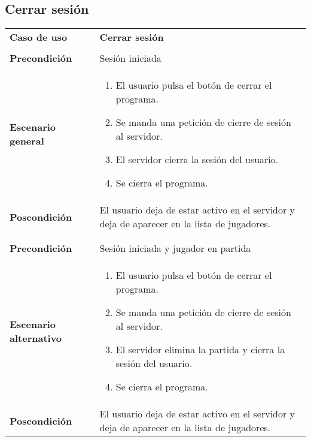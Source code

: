 \subsection{Cerrar sesión}

{\footnotesize
\begin{tabularx}{0.95\textwidth}{p{}|X}

\textbf{Caso de uso} & \textbf{Cerrar sesión} \\
& \\
\textbf{Precondición} & Sesión iniciada \\

\textbf{Escenario general} & \begin{enumerate}
\item El usuario pulsa el botón de cerrar el programa.
\item Se manda una petición de cierre de sesión al servidor.
\item El servidor cierra la sesión del usuario.
\item Se cierra el programa.
\end{enumerate} \\

\textbf{Poscondición} & El usuario deja de estar activo en el servidor y deja de aparecer
en la lista de jugadores.\\

& \\
& \\
\textbf{Precondición} & Sesión iniciada y jugador en partida \\

\textbf{Escenario alternativo} & \begin{enumerate}
\item El usuario pulsa el botón de cerrar el programa.
\item Se manda una petición de cierre de sesión al servidor.
\item El servidor elimina la partida y cierra la sesión del usuario.
\item Se cierra el programa.
\end{enumerate} \\

\textbf{Poscondición} & El usuario deja de estar activo en el servidor y deja de aparecer
en la lista de jugadores.

\end{tabularx}
}


